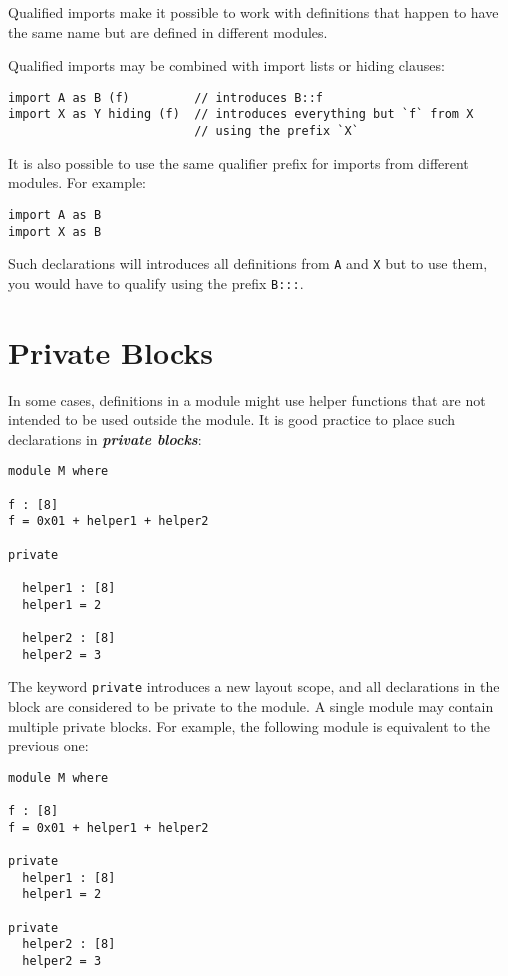 Qualified imports make it possible to work with definitions that happen
to have the same name but are defined in different modules.

Qualified imports may be combined with import lists or hiding clauses:

\begin{verbatim}
import A as B (f)         // introduces B::f
import X as Y hiding (f)  // introduces everything but `f` from X
                          // using the prefix `X`
\end{verbatim}

It is also possible to use the same qualifier prefix for imports from
different modules. For example:

\begin{verbatim}
import A as B
import X as B
\end{verbatim}

Such declarations will introduces all definitions from \texttt{A} and
\texttt{X} but to use them, you would have to qualify using the prefix
\texttt{B:::}.

\hypertarget{private-blocks}{%
\section{Private Blocks}\label{private-blocks}}

In some cases, definitions in a module might use helper functions that
are not intended to be used outside the module. It is good practice to
place such declarations in \textbf{\emph{private blocks}}:

\begin{verbatim}
module M where

f : [8]
f = 0x01 + helper1 + helper2

private

  helper1 : [8]
  helper1 = 2

  helper2 : [8]
  helper2 = 3
\end{verbatim}

The keyword \texttt{private} introduces a new layout scope, and all
declarations in the block are considered to be private to the module. A
single module may contain multiple private blocks. For example, the
following module is equivalent to the previous one:

\begin{verbatim}
module M where

f : [8]
f = 0x01 + helper1 + helper2

private
  helper1 : [8]
  helper1 = 2

private
  helper2 : [8]
  helper2 = 3
\end{verbatim}

